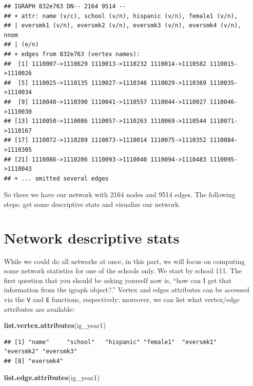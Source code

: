 \documentclass[]{book}
\newenvironment{Shaded}{\begin{snugshade}}{\end{snugshade}}
\newcommand{\KeywordTok}[1]{\textcolor[rgb]{0.13,0.29,0.53}{\textbf{#1}}}
\newcommand{\NormalTok}[1]{#1}
\begin{document}
\begin{verbatim}
## IGRAPH 832e763 DN-- 2164 9514 -- 
## + attr: name (v/c), school (v/n), hispanic (v/n), female1 (v/n),
## | eversmk1 (v/n), eversmk2 (v/n), eversmk3 (v/n), eversmk4 (v/n), nnom
## | (e/n)
## + edges from 832e763 (vertex names):
##  [1] 1110007->1110629 1110013->1110232 1110014->1110582 1110015->1110026
##  [5] 1110025->1110135 1110027->1110346 1110029->1110369 1110035->1110034
##  [9] 1110040->1110390 1110041->1110557 1110044->1110027 1110046->1110030
## [13] 1110050->1110086 1110057->1110263 1110069->1110544 1110071->1110167
## [17] 1110072->1110289 1110073->1110014 1110075->1110352 1110084->1110305
## [21] 1110086->1110206 1110093->1110040 1110094->1110483 1110095->1110043
## + ... omitted several edges
\end{verbatim}

So there we have our network with 2164 nodes and 9514 edges. The following steps: get some descriptive stats and visualize our network.

\hypertarget{network-descriptive-stats}{%
\section{Network descriptive stats}\label{network-descriptive-stats}}

While we could do all networks at once, in this part, we will focus on computing some network statistics for one of the schools only. We start by school 111. The first question that you should be asking yourself now is, ``how can I get that information from the igraph object?.'' Vertex and edges attributes can be accessed via the \texttt{V} and \texttt{E} functions, respectively; moreover, we can list what vertex/edge attributes are available:

\begin{Shaded}
\begin{Highlighting}[]
\KeywordTok{list.vertex.attributes}\NormalTok{(ig_year1)}
\end{Highlighting}
\end{Shaded}

\begin{verbatim}
## [1] "name"     "school"   "hispanic" "female1"  "eversmk1" "eversmk2" "eversmk3"
## [8] "eversmk4"
\end{verbatim}

\begin{Shaded}
\begin{Highlighting}[]
\KeywordTok{list.edge.attributes}\NormalTok{(ig_year1) }
\end{Highlighting}
\end{Shaded}
\end{document}
